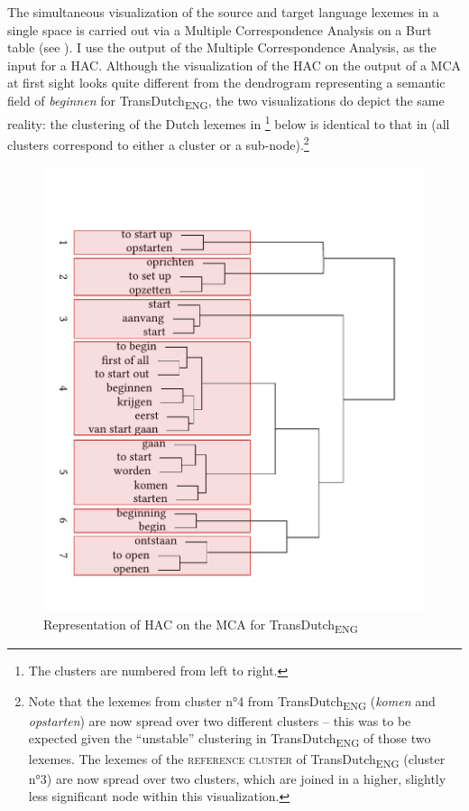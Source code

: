 The simultaneous visualization of the source and target language lexemes in a single space is carried out via a Multiple Correspondence Analysis on a Burt table \citep{greenacre_simple_2006, greenacre_correspondence_2007} (see ). I use the output of the Multiple Correspondence Analysis, as the input for a HAC. Although the visualization of the HAC on the output of a MCA at first sight looks quite different from the dendrogram representing a semantic field of \textit{beginnen} for TransDutch\textsubscript{ENG}, the two visualizations do depict the same reality: the clustering of the Dutch lexemes in \footnote{The clusters are numbered from left to right.} below is identical to that in  (all clusters correspond to either a cluster or a sub-node).\footnote{Note that the lexemes from cluster n°4 from TransDutch\textsubscript{ENG} (\textit{komen} and \textit{opstarten}) are now spread over two different clusters – this was to be expected given the ``unstable'' clustering in TransDutch\textsubscript{ENG} of those two lexemes. The lexemes of the \textsc{reference cluster} of TransDutch\textsubscript{ENG} (cluster n°3) are now spread over two clusters, which are joined in a higher, slightly less significant node within this visualization.}

\begin{figure}
\includegraphics[width=.75\textwidth,trim=0 20 0 50]{figures/tree92.pdf}
\caption{\label{fig:4:89}Representation of HAC on the MCA for TransDutch\textsubscript{ENG}}
\end{figure}

